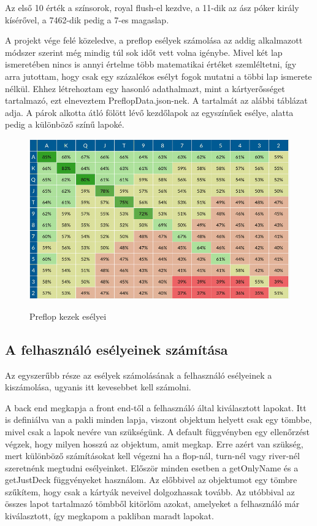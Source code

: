 Az első 10 érték a színsorok, royal flush-el kezdve, a 11-dik az ász póker király kísérővel, a 7462-dik pedig a 7-es magaslap.

A projekt vége felé közeledve, a preflop esélyek számolása az addig alkalmazott módszer szerint még mindig túl sok időt vett volna igénybe. Mivel két lap ismeretében nincs is annyi értelme több matematikai értéket szemléltetni, így arra jutottam, hogy csak egy százalékos esélyt fogok mutatni a többi lap ismerete nélkül. Ehhez létrehoztam egy hasonló adathalmazt, mint a kártyerősséget tartalmazó, ezt elneveztem PreflopData.json-nek. A tartalmát az alábbi táblázat adja. A párok alkotta átló fölött lévő kezdőlapok az egyszínűek esélye, alatta pedig a különböző színű lapoké.

\begin{figure}[h]
\centering
\includegraphics[scale=0.5]{images/preflop-chances.png}
\caption{Preflop kezek esélyei}
\cite{preflop-chances}
\label{fig:preflop-chances}
\end{figure}

\subsection{A felhasználó esélyeinek számítása}
Az egyszerűbb része az esélyek számolásának a felhasználó esélyeinek a kiszámolása, ugyanis itt kevesebbet kell számolni. 

A back end megkapja a front end-től a felhasználó által kiválasztott lapokat. Itt is definiálva van a pakli minden lapja, viszont objektum helyett csak egy tömbbe, mivel csak a lapok nevére van szükségünk. A default függvényben egy ellenőrzést végzek, hogy milyen hosszú az objektum, amit megkap. Erre azért van szükség, mert különböző számításokat kell végezni ha a flop-nál, turn-nél vagy river-nél szeretnénk megtudni esélyeinket. Először minden esetben a getOnlyName és a getJustDeck függvényeket használom. Az előbbivel az objektumot egy tömbre szűkítem, hogy csak a kártyák neveivel dolgozhassak tovább. Az utóbbival az összes lapot tartalmazó tömbből kitörlöm azokat, amelyeket a felhasználó már kiválasztott, így megkapom a pakliban maradt lapokat.

